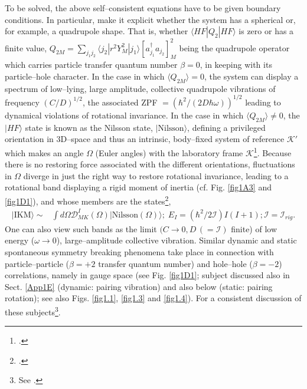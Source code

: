 To be solved, the above self--consistent equations have to be given boundary conditions. In particular, make it explicit whether the system has a spherical or, for example, a quadrupole  shape.   That is, whether $\langle HF|Q_2|HF\rangle$ is zero or has a finite value, $Q_{2M}=\sum_{j_1j_2}\langle j_2|r^2Y^2_M|j_1\rangle \left[a^\dagger_{j_1}a_{j_2}\right]^2_M$ being the quadrupole operator which carries particle transfer quantum number $\beta=0$, in keeping with its particle--hole character. In the case in which $\langle Q_{2M}\rangle=0$, the system can display a spectrum of low--lying, large amplitude, collective quadrupole vibrations of frequency $(C/D)^{1/2}$, the associated ZPF $=\left(\hbar^2/(2D\hbar\omega)\right)^{1/2}$ leading to dynamical violations of rotational invariance. In the case in which $\langle Q_{2M}\rangle\neq0$, the $|HF\rangle$ state is known as the Nilsson state, $|\text{Nilsson}\rangle$, defining a privileged orientation in 3D--space and thus an intrinsic, body--fixed system of reference $\mathcal{K}'$ which makes an angle $\Omega$ (Euler angles) with the laboratory frame $\mathcal{K}$\footnote{\cite{Nilsson:55}.}. Because there is no restoring force associated with the different orientations, fluctuations in $\Omega$ diverge in just the right way to restore rotational invariance, leading to a rotational band displaying a rigid moment of inertia (cf. Fig. \ref{fig1A3} and \ref{fig1D1}), and whose members are the states\footnote{\cite{Bohr:75}.},
 \begin{equation*}
\begin{split}
|\text{IKM}\rangle\sim&\int d\Omega \mathcal{D}_{MK}^I(\Omega)|\text{Nilsson}(\Omega)\rangle;\; E_I=(\hbar^2/2\mathcal I)I(I+1); \mathcal{I}=\mathcal{I}_{rig}.
\end{split}
\end{equation*}
One can also view such bands as the limit $(C\rightarrow 0, D\,(=\mathcal I)$ finite) of low energy ($\omega\rightarrow 0$), large--amplitude collective vibration. 
Similar dynamic and static spontaneous symmetry breaking phenomena take place in connection with particle--particle ($\beta=+2$ transfer quantum number) and hole--hole ($\beta=-2$) correlations, namely in gauge space (see Fig. \ref{fig1D1}; subject discussed also in Sect. \ref{App1E} (dynamic: pairing vibration) and also below (static: pairing rotation); see also Figs. \ref{fig1.1}, \ref{fig1.3} and \ref{fig1.4}). For a consistent discussion of these subjects\footnote{See \cite{Bes:90}.}.





